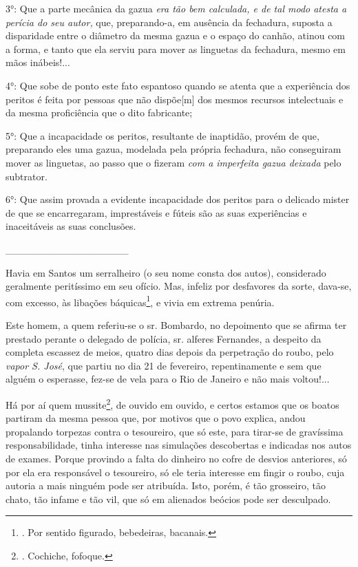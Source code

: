 3°: Que a parte mecânica da gazua \emph{era tão bem calculada, e de tal
modo atesta a perícia do seu autor,} que, preparando-a, em ausência da
fechadura, suposta a disparidade entre o diâmetro da mesma gazua e o
espaço do canhão, atinou com a forma, e tanto que ela serviu para mover
as linguetas da fechadura, mesmo em mãos inábeis!...

4°: Que sobe de ponto este fato espantoso quando se atenta que a
experiência dos peritos é feita por pessoas que não dispõe{[}m{]} dos
mesmos recursos intelectuais e da mesma proficiência que o dito
fabricante;

5°: Que a incapacidade os peritos, resultante de inaptidão, provém de
que, preparando eles uma gazua, modelada pela própria fechadura, não
conseguiram mover as linguetas, ao passo que o fizeram \emph{com a
imperfeita gazua deixada} pelo subtrator.

6°: Que assim provada a evidente incapacidade dos peritos para o
delicado mister de que se encarregaram, imprestáveis e fúteis são as
suas experiências e inaceitáveis as suas conclusões.

\_\_\_\_\_\_\_\_\_\_\_\_\_\_\_\_\_

Havia em Santos um serralheiro (o seu nome consta dos autos),
considerado geralmente peritíssimo em seu ofício. Mas, infeliz por
desfavores da sorte, dava-se, com excesso, às libações
báquicas\footnote{. Por sentido figurado, bebedeiras, bacanais.}, e
vivia em extrema penúria.

Este homem, a quem referiu-se o sr. Bombardo, no depoimento que se
afirma ter prestado perante o delegado de polícia, sr. alferes
Fernandes, a despeito da completa escassez de meios, quatro dias depois
da perpetração do roubo, pelo \emph{vapor S. José}, que partiu no dia 21
de fevereiro, repentinamente e sem que alguém o esperasse, fez-se de
vela para o Rio de Janeiro e não mais voltou!...

Há por aí quem mussite\footnote{. Cochiche, fofoque.}, de ouvido em
ouvido, e certos estamos que os boatos partiram da mesma pessoa que, por
motivos que o povo explica, andou propalando torpezas contra o
tesoureiro, que só este, para tirar-se de gravíssima responsabilidade,
tinha interesse nas simulações descobertas e indicadas nos autos de
exames. Porque provindo a falta do dinheiro no cofre de desvios
anteriores, só por ela era responsável o tesoureiro, só ele teria
interesse em fingir o roubo, cuja autoria a mais ninguém pode ser
atribuída. Isto, porém, é tão grosseiro, tão chato, tão infame e tão
vil, que só em alienados beócios pode ser desculpado.

